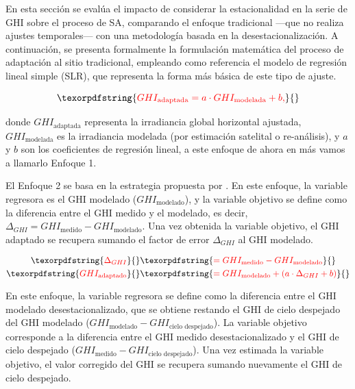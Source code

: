 \documentclass[letterpaper,12pt, twoside]{report}
\providecommand{\DIFdeltex}[1]{{\protect\color{red} \scriptsize #1}} %
\providecommand{\DIFdel}[1]{\texorpdfstring{\DIFdeltex{#1}}{}} %
\begin{document}
\DIFdel{En esta sección se evalúa el impacto de considerar la estacionalidad en la serie de GHI sobre el proceso de SA, comparando el enfoque tradicional —que no realiza ajustes temporales— con una metodología basada en la desestacionalización. A continuación, se presenta formalmente la formulación matemática del proceso de adaptación al sitio tradicional, empleando como referencia el modelo de regresión lineal simple (SLR), que representa la forma más básica de este tipo de ajuste.
}%

\begin{displaymath}
\DIFdel{GHI_{\text{adaptada}} = a \cdot GHI_{\text{modelada}} + b,
}\end{displaymath}%

\DIFdel{donde \(GHI_{\text{adaptada}}\) representa la irradiancia global horizontal ajustada, \(GHI_{\text{modelada}}\) es la irradiancia modelada (por estimación satelital o re-análisis), y \(a\) y \(b\) son los coeficientes de regresión lineal, a este enfoque de ahora en más vamos a llamarlo Enfoque 1.}%

\DIFdel{El Enfoque 2 se basa en la estrategia propuesta por \cite{SALAMALIKIS2022}. En este enfoque, la variable regresora es el GHI modelado ($GHI_{\text{modelado}}$), y la variable objetivo se define como la diferencia entre el GHI medido y el modelado, es decir, 
$\Delta_{GHI} = GHI_{\text{medido}} - GHI_{\text{modelado}}$. Una vez obtenida la variable objetivo, el GHI adaptado se recupera sumando el factor de error $\Delta_{GHI}$ al GHI modelado.
}%

\begin{align*}
\DIFdel{\Delta_{GHI} }&\DIFdel{= GHI_{\text{medido}} - GHI_{\text{modelado}} }\\
\DIFdel{GHI_{\text{adaptado}} }&\DIFdel{= GHI_{\text{modelado}} + (a \cdot \Delta_{GHI} + b)
}\end{align*}%

\DIFdel{En este enfoque, la variable regresora se define como la diferencia entre el GHI modelado desestacionalizado, que se obtiene restando el GHI de cielo despejado del GHI modelado ($GHI_{\text{modelado}} - GHI_{\text{cielo despejado}}$). La variable objetivo corresponde a la diferencia entre el GHI medido desestacionalizado y el GHI de cielo despejado ($GHI_{\text{medido}} - GHI_{\text{cielo despejado}}$). Una vez estimada la variable objetivo, el valor corregido del GHI se recupera sumando nuevamente el GHI de cielo despejado.
}%
\end{document}
